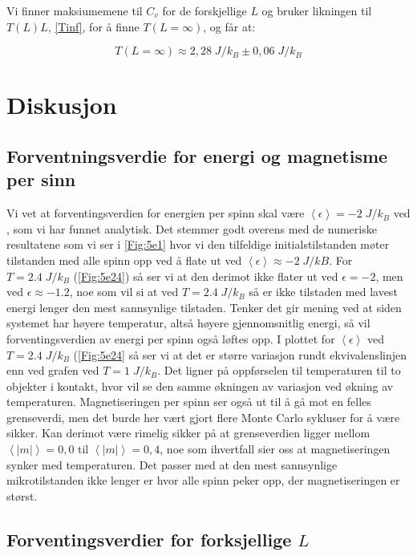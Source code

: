 \documentclass[reprint,english,notitlepage]{revtex4-2}  %
\begin{document}
Vi finner maksiumemene til $C_v$ for de forskjellige $L$ og bruker likningen til $T\left ( L \right ) L$, \eqref{Tinf}, for å finne $T \left ( L = \infty \right )$, og får at:

$$ T \left ( L = \infty \right ) \approx 2,28 \; J/k_B \pm 0,06 \; J/k_B$$   

\section{Diskusjon}



\subsection*{Forventningsverdie for energi og magnetisme per sinn}

Vi vet at forventingsverdien for energien per spinn skal være $\left < \epsilon \right > = -2 \; J/k_B$ ved , som vi har funnet analytisk. Det stemmer godt overens med de numeriske resultatene som vi ser i \autoref{Fig:5e1} hvor vi den tilfeldige initialstilstanden møter tilstanden med alle spinn opp ved å flate ut ved $\left < \epsilon \right > \approx -2 \; J/kB$. For $T = 2.4 \; J/k_B$ (\autoref{Fig:5e24}) så ser vi at den derimot ikke flater ut ved $ \epsilon = -2$, men ved $\epsilon \approx -1.2 $, noe som vil si at ved $T = 2.4 \; J/k_B$ så er ikke tilstaden med lavest energi lenger den mest sannsynlige tilstaden. Tenker det gir mening ved at siden systemet har høyere temperatur, altså høyere gjennomsnitlig energi, så vil forventingsverdien av energi per spinn også løftes opp. I plottet for $\left < \epsilon \right >$ ved $T = 2.4  \; J/k_B$ (\autoref{Fig:5e24} så ser vi at det er større variasjon rundt ekvivalenslinjen enn ved grafen ved $T = 1 \; J/k_B$. Det ligner på oppførselen til temperaturen til to objekter i kontakt, hvor vil se den samme økningen av variasjon ved økning av temperaturen. Magnetiseringen per spinn ser også ut til å gå mot en felles grenseverdi, men det burde her vært gjort flere Monte Carlo sykluser for å være sikker. Kan derimot være rimelig sikker på at grenseverdien ligger mellom $\left < | m | \right > = 0,0$ til $\left < | m | \right > = 0,4$, noe som ihvertfall sier oss at magnetiseringen synker med temperaturen. Det passer med at den mest sannsynlige mikrotilstanden ikke lenger er hvor alle spinn peker opp, der magnetiseringen er størst.

\subsection*{Forventingsverdier for forksjellige $L$}
\end{document}
